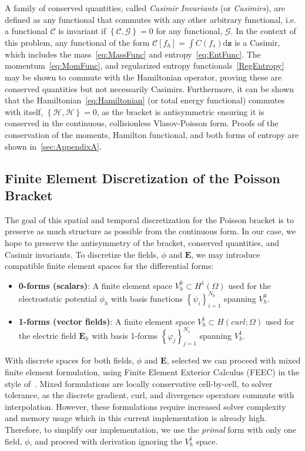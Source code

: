 \documentclass[preprint,12pt]{elsarticle}
\theoremstyle{definition}
\begin{document}
A family of conserved quantities, called \textit{Casimir Invariants} (or \textit{Casimirs}), are defined as any functional that commutes with any other arbitrary functional, i.e. a functional $\mathcal{C}$ is invariant if $\left\{\mathcal{C},\mathcal{G}\right\}=0$ for any functional, $\mathcal{G}$. In the context of this problem, any functional of the form $\mathcal{C}\left[f_h\right]=\int C(f_s) \mathrm{d} \mathbf{z}$ is a Casimir, which includes the mass~\eqref{eq:MassFunc} and entropy~\eqref{eq:EntFunc}. 
The momentum~\eqref{eq:MomFunc}, and regularized entropy functionals~\eqref{RegEntropy} may be shown to commute with the Hamiltonian operator, proving these are conserved quantities but not necessarily Casimirs. 
Furthermore, it can be shown that the Hamiltonian~\eqref{eq:Hamiltonian} (or total energy functional) commutes with itself, $\left\{\mathcal{H},\mathcal{H}\right\}=0$, as the bracket is antisymmetric ensuring it is conserved in the continuous, collisionless Vlasov-Poisson form. Proofs of the conservation of the moments, Hamilton functional, and both forms of entropy are shown in~\ref{sec:AppendixA}.

\subsection{Finite Element Discretization of the Poisson Bracket}\label{sec:FEPoissonBracket}
The goal of this spatial and temporal discretization for the Poisson bracket is to preserve as much structure as possible from the continuous form. In our case, we hope to preserve the antisymmetry of the bracket, conserved quantities, and Casimir invariants. To discretize the fields, $\phi$ and $\boldsymbol{E}$, we may introduce compatible finite element spaces for the differential forms:
\begin{itemize}
    \item \textbf{0-forms (scalars)}: A finite element space $V^0_h \subset H^{1} (\Omega)$ used for the electrostatic potential $\phi_h$ with basis functions $\left\{\psi_i\right\}_{i=1}^{N_0}$ spanning $V^0_h$.
    \item \textbf{1-forms (vector fields)}: A finite element space $V^1_h  \subset H (curl;\Omega)$ used for the electric field $\boldsymbol{E}_h$ with basis 1-forms $\left\{\varphi_j\right\}_{j=1}^{N_1}$ spanning $V^1_h$.
\end{itemize}
\noindent With discrete spaces for both fields, $\phi$ and $\boldsymbol{E}$, selected we can proceed with mixed finite element formulation, using Finite Element Exterior Calculus (FEEC) in the style of~\cite{Kraus2017_GEMPIC}. Mixed formulations are locally conservative cell-by-cell, to solver tolerance, as the discrete gradient, curl, and divergence operators commute with interpolation. However, these formulations require increased solver complexity and memory usage which in this current implementation is already high. Therefore, to simplify our implementation, we use the \textit{primal} form with only one field, $\phi$, and proceed with derivation ignoring the $V^1_h$ space.
\end{document}
